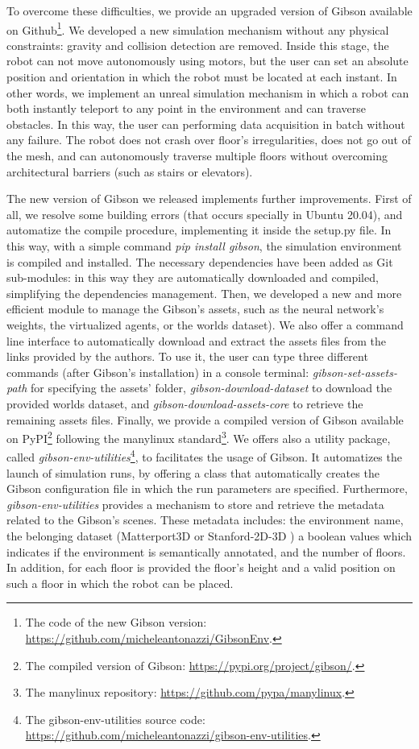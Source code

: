 To overcome these difficulties, we provide an upgraded version of Gibson available on Github\footnote{The code of the new Gibson version: \url{https://github.com/micheleantonazzi/GibsonEnv}.}. We developed a new simulation mechanism without any physical constraints: gravity and collision detection are removed. Inside this stage, the robot can not move autonomously using motors, but the user can set an absolute position and orientation in which the robot must be located at each instant. In other words, we implement an unreal simulation mechanism in which a robot can both instantly teleport to any point in the environment and can traverse obstacles. In this way, the user can performing data acquisition in batch without any failure. The robot does not crash over floor's irregularities, does not go out of the mesh, and can autonomously traverse multiple floors without overcoming architectural barriers (such as stairs or elevators).

The new version of Gibson we released implements further improvements. First of all, we resolve some building errors (that occurs specially in Ubuntu 20.04), and automatize the compile procedure, implementing it inside the \textsf{setup.py} file. In this way, with a simple command \textit{pip install gibson}, the simulation environment is compiled and installed. The necessary dependencies have been added as Git sub-modules: in this way they are automatically downloaded and compiled, simplifying the dependencies management. Then, we developed a new and more efficient module to manage the Gibson's assets, such as the neural network's weights, the virtualized agents, or the worlds dataset). We also offer a command line interface to automatically download and extract the assets files from the links provided by the authors. To use it, the user can type three different commands (after Gibson's installation) in a console terminal: \textit{gibson-set-assets-path} for specifying the assets' folder, \textit{gibson-download-dataset} to download the provided worlds dataset, and \textit{gibson-download-assets-core} to retrieve the remaining assets files. Finally, we provide a compiled version of Gibson available on PyPI\footnote{The compiled version of Gibson: \url{https://pypi.org/project/gibson/}.} following the manylinux standard\footnote{The manylinux repository: \url{https://github.com/pypa/manylinux}.}. We offers also a utility package, called \textit{gibson-env-utilities}\footnote{The gibson-env-utilities source code: \url{https://github.com/micheleantonazzi/gibson-env-utilities}.}, to facilitates the usage of Gibson. It automatizes the launch of simulation runs, by offering a class that automatically creates the Gibson configuration file in which the run parameters are specified. Furthermore, \textit{gibson-env-utilities} provides a mechanism to store and retrieve the metadata related to the Gibson's scenes. These metadata includes: the environment name, the belonging dataset (Matterport3D \cite{matterport} or Stanford-2D-3D \cite{stanford2d3d}) a boolean values which indicates if the environment is semantically annotated, and the number of floors. In addition, for each floor is provided the floor's height and a valid position on such a floor in which the robot can be placed.



